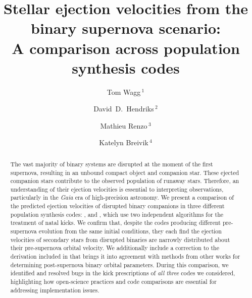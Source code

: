 \documentclass[apj,twocolumn]{openjournal}
\begin{document}
\author{Tom Wagg\,$^{1}$}
\author{David~D.~Hendriks\,$^{2}$}
\author{Mathieu Renzo\,$^{3}$}
\author{Katelyn Breivik\,$^{4}$}



\title{Stellar ejection velocities from the binary supernova scenario:\\A comparison across population synthesis codes}


\begin{abstract}
    The vast majority of binary systems are disrupted at the moment of the first supernova, resulting in an unbound compact object and companion star. These ejected companion stars contribute to the observed population of runaway stars. Therefore, an understanding of their ejection velocities is essential to interpreting observations, particularly in the \textit{Gaia} era of high-precision astronomy.
    We present a comparison of the predicted ejection velocities of disrupted binary companions in three different population synthesis codes: \cosmic, \compas and \binc, which use two independent algorithms for the treatment of natal kicks. We confirm that, despite the codes producing different pre-supernova evolution from the same initial conditions, they each find the ejection velocities of secondary stars from disrupted binaries are narrowly distributed about their pre-supernova orbital velocity. We additionally include a correction to the derivation included in \citet{Kiel+2009:2009MNRAS.395.2326K} that brings it into agreement with methods from other works for determining post-supernova binary orbital parameters. During this comparison, we identified and resolved bugs in the kick prescriptions of \textit{all three} codes we considered, highlighting how open-science practices and code comparisons are essential for addressing implementation issues.
\end{abstract}
\end{document}

